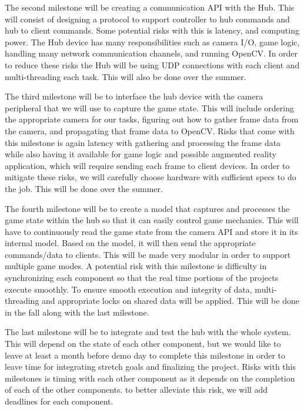 \documentclass[11pt]{ieeeconf}
\begin{document}
The second milestone will be creating a communication API with the Hub. This will consist of designing a protocol to support controller to hub commands and hub to client commands. Some potential risks with this is latency, and computing power. The Hub device has many responsibilities such as camera I/O, game logic, handling many network communication channels, and running OpenCV. In order to reduce these risks the Hub will be using UDP connections with each client and multi-threading each task. This will also be done over the summer.

The third milestone will be to interface the hub device with the camera peripheral that we will use to capture the game state. This will include ordering the appropriate camera for our tasks, figuring out how to gather frame data from the camera, and propagating that frame data to OpenCV. Risks that come with this milestone is again latency with gathering and processing the frame data while also having it available for game logic and possible augmented reality application, which will require sending each frame to client devices. In order to mitigate these risks, we will carefully choose hardware with sufficient specs to do the job. This will be done over the summer.

The fourth milestone will be to create a model that captures and processes the game state within the hub so that it can easily control game mechanics. This will have to continuously read the game state from the camera API and store it in its internal model. Based on the model, it will then send the appropriate commands/data to clients. This will be made very modular in order to support multiple game modes. A potential risk with this milestone is difficulty in synchronizing each component so that the real time portions of the projects execute smoothly. To ensure smooth execution and integrity of data, multi-threading and appropriate locks on shared data will be applied. This will be done in the fall along with the last milestone.

The last milestone will be to integrate and test the hub with the whole system. This will depend on the state of each other component, but we would like to leave at least a month before demo day to complete this milestone in order to leave time for integrating stretch goals and finalizing the project. Risks with this milestones is timing with each other component as it depends on the completion of each of the other components. to better alleviate this risk, we will add deadlines for each component.  
\end{document}
